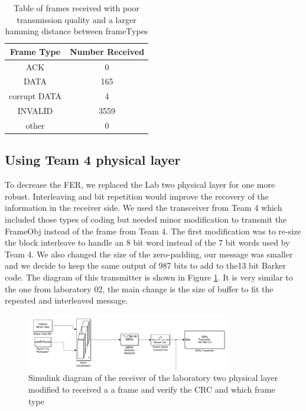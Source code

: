 \begin{table}[ht]
	\centering
		\begin{tabular}{| c | c | }
		\hline                       
		Frame Type & Number Received\\
		\hline
			ACK & 0\\
			DATA & 165\\
			corrupt DATA & 4\\
			INVALID & 3559\\
			other & 0\\
		\hline
		\end{tabular}
	\caption{Table of frames received with poor transmission quality and a larger hamming distance between frameTypes}
	\label{tab:0ACK}
\end{table}
\subsection{Using Team 4 physical layer}
\label{team4_results}
To decrease the FER, we replaced the Lab two physical layer for one more robust. Interleaving and bit repetition would improve the recovery of the information in the receiver side.
We used the transceiver from Team 4  which included those types of coding but needed minor modification to transmit the FrameObj instead of the frame from Team 4.
The first modification was to re-size the block interleave to handle an 8 bit word instead of the 7 bit words used by Team 4. We also changed the size of the zero-padding, our message was smaller and we decide to keep the same output of 987 bits to add to the13 bit Barker code. The diagram of this transmitter is shown in Figure \ref{fig:transmitter_team4}. It is very similar to the one from laboratory 02,  the main change is the size of buffer to fit the repeated and interleaved message. 
 
\begin{figure}[ht]
    \centering
    \includegraphics[width=0.8\textwidth]{transmitter_team4.PNG}
    \caption{Simulink diagram of the receiver of the laboratory two physical layer modified to received a a frame and verify the CRC and which frame type }
    \label{fig:transmitter_team4}
\end{figure}

